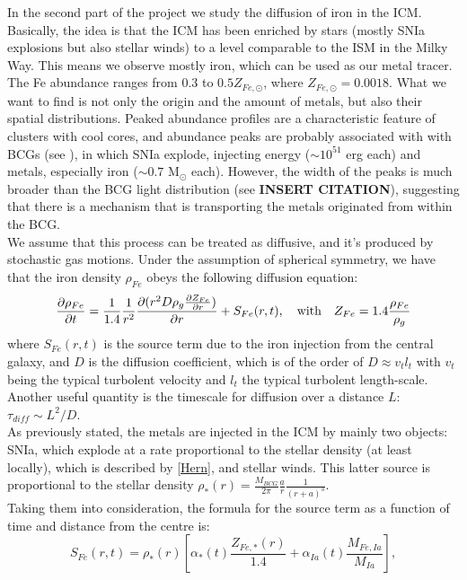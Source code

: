 \documentclass{article}
\begin{document}
In the second part of the project we study the diffusion of iron in the ICM. Basically, the idea is that the ICM has been enriched by stars (mostly SNIa explosions but also stellar winds) to a level comparable to the ISM in the Milky Way. This means we observe mostly iron, which can be used as our metal tracer.
The Fe abundance ranges from $0.3$ to $0.5 Z_{Fe,\odot}$, where $Z_{Fe,\odot}=0.0018$.
What we want to find is not only the origin and the amount of metals, but also their spatial distributions. Peaked abundance profiles are a characteristic feature of clusters with cool cores, and abundance peaks are probably associated with with BCGs (see \cite{rebusco}), in which SNIa explode, injecting energy ($\sim 10^{51}$ erg each) and metals, especially iron ($\sim 0.7$ M$_{\odot}$ each).
However, the width of the peaks is much broader than the BCG light distribution (see \textbf{INSERT CITATION}), suggesting that there is a mechanism that is transporting the metals originated from within the BCG.\\ 
We assume that this process can be treated as diffusive, and it's produced by stochastic gas motions. Under the assumption of spherical symmetry, we have that the iron density $\rho_{Fe}$ obeys the following diffusion equation:
\begin{equation} \label{diffeq}
	\pdv{\rho_{Fe}}{t}=\frac{1}{1.4}\frac{1}{r^{2}}\pdv{(r^{2}D\rho_{g}\pdv{Z_{Fe}}{r})}{r}+S_{Fe}(r,t), \quad \text{with}\quad Z_{Fe}=1.4\frac{\rho_{Fe}}{\rho_{g}}
\end{equation} 
where $S_{Fe}(r,t)$ is the source term due to the iron injection from the central galaxy, and $D$ is the diffusion coefficient, which is of the order of $D\approx v_{t}l_{t}$ with $v_{t}$ being the typical turbolent velocity and $l_{t}$ the typical turbolent length-scale. Another useful quantity is the timescale for diffusion over a distance $L$: $\tau_{diff}\sim L^{2}/D$.\\
As previously stated, the metals are injected in the ICM by mainly two objects: SNIa, which explode at a rate proportional to the stellar density (at least locally), which is described
by \eqref{Hern}, and stellar winds. This latter source is proportional to the stellar density $\rho_{*}(r)=\frac{M_{BCG}}{2\pi}\frac{a}{r}\frac{1}{(r+a)^{3}}$.\\
Taking them into consideration, the formula for the source term as a function of time and distance from the centre is:
\begin{equation} \label{source}
		S_{Fe}(r,t)=\rho_{*}(r)\left[\alpha_{*}(t)\frac{Z_{Fe,*}(r)}{1.4}+\alpha_{Ia}(t)\frac{M_{Fe,Ia}}{M_{Ia}}\right],
\end{equation}
\end{document}
